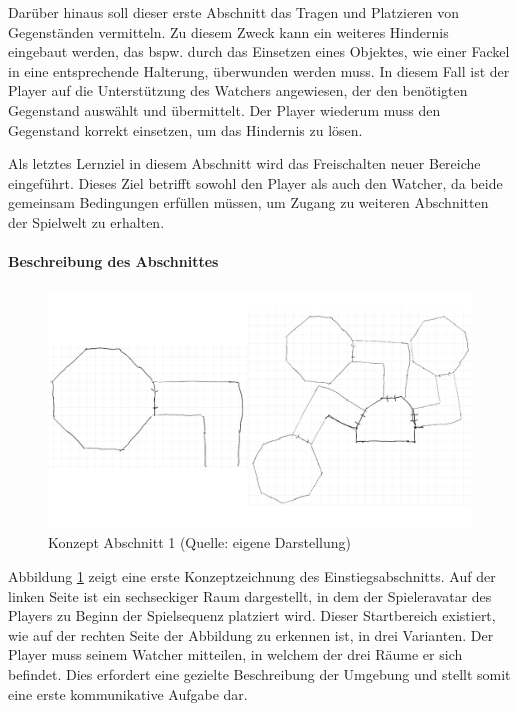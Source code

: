 Darüber hinaus soll dieser erste Abschnitt das Tragen und Platzieren von Gegenständen vermitteln. Zu diesem Zweck kann ein weiteres Hindernis eingebaut werden, das bspw. durch das Einsetzen eines Objektes, wie einer Fackel in eine entsprechende Halterung, überwunden werden muss. In diesem Fall ist der Player auf die Unterstützung des Watchers angewiesen, der den benötigten Gegenstand auswählt und übermittelt. Der Player wiederum muss den Gegenstand korrekt einsetzen, um das Hindernis zu lösen.

Als letztes Lernziel in diesem Abschnitt wird das Freischalten neuer Bereiche eingeführt. Dieses Ziel betrifft sowohl den Player als auch den Watcher, da beide gemeinsam Bedingungen erfüllen müssen, um Zugang zu weiteren Abschnitten der Spielwelt zu erhalten.

\paragraph{Beschreibung des Abschnittes}

\begin{figure}[ht]
\centering
\includegraphics[width=1\linewidth]{content/pictures/Abschnitt_Concept_00.png}
\caption{Konzept Abschnitt 1 (Quelle: eigene Darstellung)}
\label{fig:section_00_concept}
\end{figure}

Abbildung \ref{fig:section_00_concept} zeigt eine erste Konzeptzeichnung des Einstiegsabschnitts. Auf der linken Seite ist ein sechseckiger Raum dargestellt, in dem der Spieleravatar des Players zu Beginn der Spielsequenz platziert wird. Dieser Startbereich existiert, wie auf der rechten Seite der Abbildung zu erkennen ist, in drei Varianten. Der Player muss seinem Watcher mitteilen, in welchem der drei Räume er sich befindet. Dies erfordert eine gezielte Beschreibung der Umgebung und stellt somit eine erste kommunikative Aufgabe dar.

